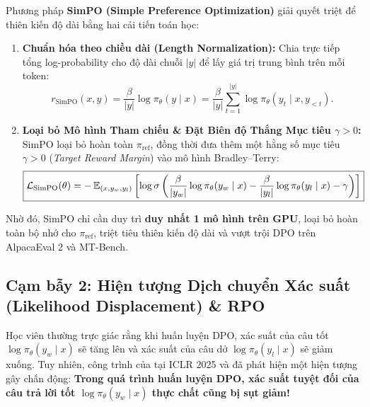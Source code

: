 \begin{definition}
Phương pháp \textbf{SimPO (Simple Preference Optimization)} giải quyết triệt để thiên kiến độ dài bằng hai cải tiến toán học:
\begin{enumerate}[label=(\alph*), leftmargin=1.2cm]
    \item \textbf{Chuẩn hóa theo chiều dài (Length Normalization):} Chia trực tiếp tổng log-probability cho độ dài chuỗi $|y|$ để lấy giá trị trung bình trên mỗi token:
    \begin{equation}
        r_{\text{SimPO}}(x, y) = \frac{\beta}{|y|} \log \pi_\theta(y \mid x) = \frac{\beta}{|y|} \sum_{t=1}^{|y|} \log \pi_\theta(y_t \mid x, y_{<t}).
    \end{equation}
    \item \textbf{Loại bỏ Mô hình Tham chiếu \& Đặt Biên độ Thắng Mục tiêu $\gamma > 0$:} SimPO loại bỏ hoàn toàn $\pi_{\text{ref}}$, đồng thời đưa thêm một hằng số mục tiêu $\gamma > 0$ (\textit{Target Reward Margin}) vào mô hình Bradley--Terry:
    \begin{equation}
        \boxed{\mathcal{L}_{\text{SimPO}}(\theta) = -\operatorname{\mathbb{E}}_{(x, y_w, y_l)} \left[ \log \sigma \left( \frac{\beta}{|y_w|} \log \pi_\theta(y_w \mid x) - \frac{\beta}{|y_l|} \log \pi_\theta(y_l \mid x) - \gamma \right) \right]}
        \label{eq:simpo_loss}
    \end{equation}
\end{enumerate}
Nhờ đó, SimPO chỉ cần duy trì \textbf{duy nhất 1 mô hình trên GPU}, loại bỏ hoàn toàn bộ nhớ cho $\pi_{\text{ref}}$, triệt tiêu thiên kiến độ dài và vượt trội DPO trên AlpacaEval 2 và MT-Bench.
\end{definition}

\subsection{Cạm bẫy 2: Hiện tượng Dịch chuyển Xác suất (Likelihood Displacement) \& RPO \citep{razin2024unintentional, pang2024iterative}}
Học viên thường trực giác rằng khi huấn luyện DPO, xác suất của câu tốt $\log \pi_\theta(y_w \mid x)$ sẽ tăng lên và xác suất của câu dở $\log \pi_\theta(y_l \mid x)$ sẽ giảm xuống.
Tuy nhiên, công trình của \citet{razin2024unintentional} tại ICLR 2025 và \citet{pal2024smaug} đã phát hiện một hiện tượng gây chấn động: \textbf{Trong quá trình huấn luyện DPO, xác suất tuyệt đối của câu trả lời tốt $\log \pi_\theta(y_w \mid x)$ thực chất cũng bị sụt giảm!}

